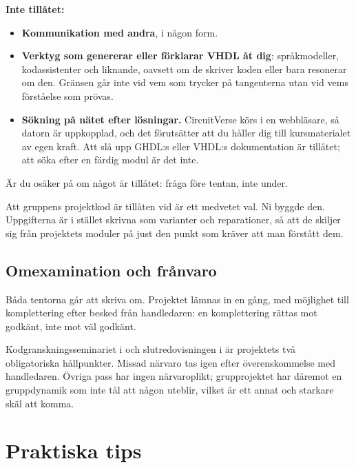 \textbf{Inte tillåtet:}
\begin{itemize}
  \item \textbf{Kommunikation med andra}, i någon form.
  \item \textbf{Verktyg som genererar eller förklarar VHDL åt dig}: språkmodeller, kodassistenter och
    liknande, oavsett om de skriver koden eller bara resonerar om den. Gränsen går inte vid vem som
    trycker på tangenterna utan vid vems förståelse som prövas.
  \item \textbf{Sökning på nätet efter lösningar.} CircuitVerse körs i en webbläsare, så datorn är
    uppkopplad, och det förutsätter att du håller dig till kursmaterialet av egen kraft. Att slå upp
    GHDL:s eller VHDL:s dokumentation är tillåtet; att söka efter en färdig modul är det inte.
\end{itemize}

Är du osäker på om något är tillåtet: fråga före tentan, inte under.

Att gruppens projektkod är tillåten vid  är ett medvetet val. Ni byggde den.
Uppgifterna är i stället skrivna som varianter och reparationer, så att de skiljer sig från
projektets moduler på just den punkt som kräver att man förstått dem.

\subsection{Omexamination och frånvaro}
\label{app:project:reexam}

Båda tentorna går att skriva om. Projektet lämnas in en gång, med möjlighet till komplettering efter
besked från handledaren: en komplettering rättas mot godkänt, inte mot väl godkänt.

Kodgranskningsseminariet i  och slutredovisningen i  är projektets två
obligatoriska hållpunkter. Missad närvaro tas igen efter överenskommelse med handledaren. Övriga pass
har ingen närvaroplikt; grupprojektet har däremot en gruppdynamik som inte tål att någon uteblir,
vilket är ett annat och starkare skäl att komma.

\section{Praktiska tips}
\label{app:project:tips}

